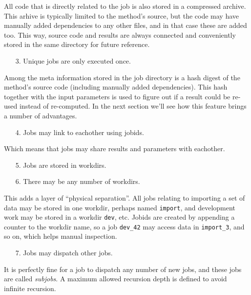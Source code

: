 \documentclass[a4paper]{article}
\begin{document}
All code that is directly related to the job is also stored in a
compressed archive.  This arhive is typically limited to the method's
source, but the code may have manually added dependencies to any other
files, and in that case these are added too.  This way, source code
and results are always connected and conveniently stored in the same
directory for future reference.
\begin{itemize}
\item[3.]  Unique jobs are only executed once.
\end{itemize}
Among the meta information stored in the job directory is a hash
digest of the method's source code (including manually added
dependencies).  This hash together with the input parameters is used
to figure out if a result could be re-used instead of re-computed.  In
the next section we'll see how this feature brings a number of
advantages.
\begin{itemize}
\item[4.]  Jobs may link to eachother using jobids.
\end{itemize}
Which means that jobs may share results and parameters with eachother.
\begin{itemize}
\item[5.]  Jobs are stored in workdirs.
\item[6.]  There may be any number of workdirs.
\end{itemize}
This adds a layer of ``physical separation''.  All jobs relating to
importing a set of data may be stored in one workdir, perhaps named
\texttt{import}, and development work may be stored in a workdir
\texttt{dev}, etc.  Jobids are created by appending a counter to the
workdir name, so a job \texttt{dev\_42} may access data in
\texttt{import\_3}, and so on, which helps manual inspection.
\begin{itemize}
\item[7.] Jobs may dispatch other jobs.
\end{itemize}
It is perfectly fine for a job to dispatch any number of new jobs, and
these jobs are called \textsl{subjobs}.  A maximum allowed recursion
depth is defined to avoid infinite recursion.
\clearpage
\end{document}
